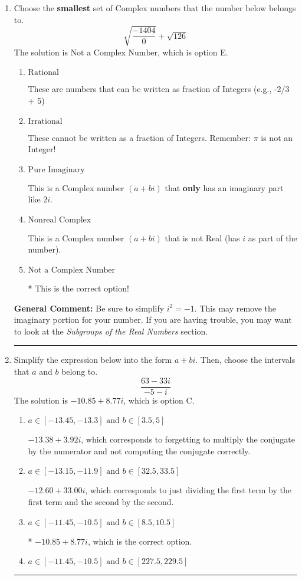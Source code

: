 \documentclass{extbook}[14pt]
\newcommand{\litem}[1]{\item #1

\rule{\textwidth}{0.4pt}}
\begin{document}
\begin{enumerate}\litem{
Choose the \textbf{smallest} set of Complex numbers that the number below belongs to.
\[ \sqrt{\frac{-1404}{0}}+\sqrt{126} \]The solution is \( \text{Not a Complex Number} \), which is option E.\begin{enumerate}[label=\Alph*.]
\item \( \text{Rational} \)

These are numbers that can be written as fraction of Integers (e.g., -2/3 + 5)
\item \( \text{Irrational} \)

These cannot be written as a fraction of Integers. Remember: $\pi$ is not an Integer!
\item \( \text{Pure Imaginary} \)

This is a Complex number $(a+bi)$ that \textbf{only} has an imaginary part like $2i$.
\item \( \text{Nonreal Complex} \)

This is a Complex number $(a+bi)$ that is not Real (has $i$ as part of the number).
\item \( \text{Not a Complex Number} \)

* This is the correct option!
\end{enumerate}

\textbf{General Comment:} Be sure to simplify $i^2 = -1$. This may remove the imaginary portion for your number. If you are having trouble, you may want to look at the \textit{Subgroups of the Real Numbers} section.
}
\litem{
Simplify the expression below into the form $a+bi$. Then, choose the intervals that $a$ and $b$ belong to.
\[ \frac{63 - 33 i}{-5 - i} \]The solution is \( -10.85  + 8.77 i \), which is option C.\begin{enumerate}[label=\Alph*.]
\item \( a \in [-13.45, -13.3] \text{ and } b \in [3.5, 5] \)

 $-13.38  + 3.92 i$, which corresponds to forgetting to multiply the conjugate by the numerator and not computing the conjugate correctly.
\item \( a \in [-13.15, -11.9] \text{ and } b \in [32.5, 33.5] \)

 $-12.60  + 33.00 i$, which corresponds to just dividing the first term by the first term and the second by the second.
\item \( a \in [-11.45, -10.5] \text{ and } b \in [8.5, 10.5] \)

* $-10.85  + 8.77 i$, which is the correct option.
\item \( a \in [-11.45, -10.5] \text{ and } b \in [227.5, 229.5] \)


\end{enumerate}}
\end{enumerate}
\end{document}
